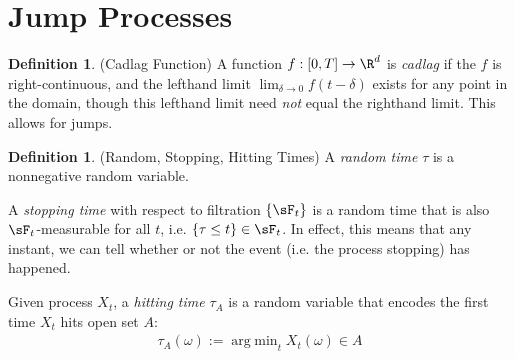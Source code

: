 \documentclass[12pt]{article}
\theoremstyle{plain}
\theoremstyle{definition}
\newtheorem{defn}[thm]{Definition}
\theoremstyle{remark}
\newcommand{\ra}{\rightarrow}
\DeclareMathOperator*{\argmin}{arg\;min}
\begin{document}


\clearpage
\section{Jump Processes}


\begin{defn}(Cadlag Function)
A function $f:[0,T]\ra\R^d$ is \emph{cadlag} if the $f$ is
right-continuous, and the lefthand limit $\lim_{\delta \ra 0}
f(t-\delta)$ exists for any point in the domain, though this lefthand
limit need \emph{not} equal the righthand limit.
This allows for jumps.
\end{defn}
\begin{defn}(Random, Stopping, Hitting Times)
A \emph{random time} $\tau$ is a nonnegative random variable.

A \emph{stopping time} with respect to filtration $\{\sF_t\}$ is a
random time that is also $\sF_t$-measurable for all $t$, i.e.
$\{\tau\leq t\}\in\sF_t$. In effect, this means that any instant, we can
tell whether or not the event (i.e. the process stopping) has happened.

Given process $X_t$, a \emph{hitting time} $\tau_A$ is a random variable
that encodes the first time $X_t$ hits open set $A$:
\begin{align*}
  \tau_A(\omega):=\argmin_{t} X_t(\omega)\in A
\end{align*}
\end{defn}
\end{document}
